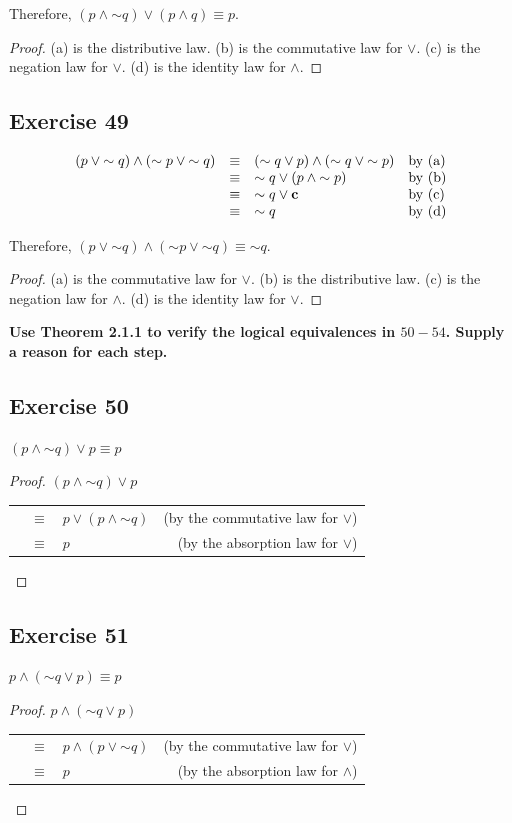 \documentclass[14pt]{extarticle}
\newcommand{\false}{{\bf c}} \newcommand{\bic}{\leftrightarrow}
\begin{document}
Therefore, $(p \wedge {\sim q}) \vee (p \wedge q) \equiv p$.

\begin{proof} (a) is the distributive law. (b) is the commutative law for
$\vee$. (c) is the negation law for $\vee$. (d) is the identity law for
$\wedge$. \end{proof}

\subsection{Exercise 49} $$ \begin{array}{rcll} (p \vee {\sim q}) \wedge ({\sim
p} \vee {\sim q}) & \equiv & ({\sim q} \vee p) \wedge ({\sim q} \vee {\sim p}) &
\text{by (a)} \\ & \equiv & {\sim q} \vee (p \wedge {\sim p}) & \text{by (b)} \\
& \equiv & {\sim q} \vee \false & \text{by (c)} \\ & \equiv & {\sim q} &
\text{by (d)} \\ \end{array} $$

Therefore, $(p \vee {\sim q}) \wedge ({\sim p} \vee {\sim q}) \equiv {\sim q}$.

\begin{proof} (a) is the commutative law for $\vee$. (b) is the distributive
law. (c) is the negation law for $\wedge$. (d) is the identity law for $\vee$.
\end{proof}

{\bf Use Theorem 2.1.1 to verify the logical equivalences in $50-54$. Supply a
reason for each step.}

\subsection{Exercise 50} $(p \wedge {\sim q}) \vee p \equiv p$
\begin{proof} $(p \wedge {\sim q}) \vee p$
\begin{tabular}{rclr} & $\equiv$ & $p \vee (p \wedge {\sim q})$ & (by the
commutative law for $\vee$) \\ & $\equiv$ & $p$ & (by the absorption law for
$\vee$) \\ \end{tabular} \end{proof}

\subsection{Exercise 51} $p \wedge ({\sim q} \vee p) \equiv p$
\begin{proof} $p \wedge ({\sim q} \vee p)$
\begin{tabular}{rclr} & $\equiv$ & $p \wedge (p \vee {\sim q})$ & (by the
commutative law for $\vee$) \\ & $\equiv$ & $p$ & (by the absorption law for
$\wedge$) \\ \end{tabular} \end{proof}
\end{document}
